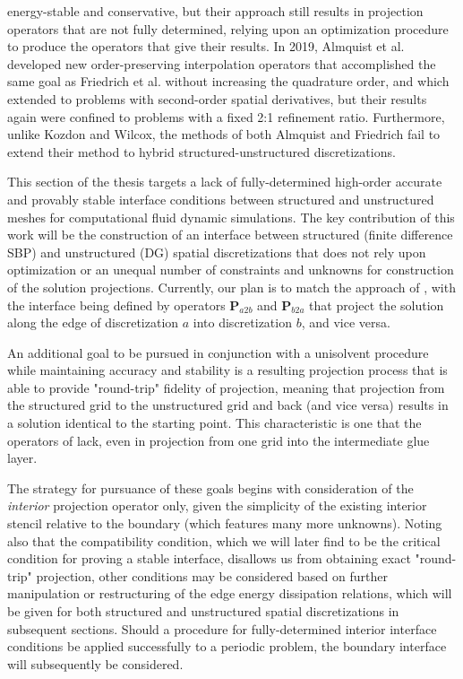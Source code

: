 energy-stable and conservative, but their approach still results in projection
operators that are not fully determined, relying upon an optimization procedure
to produce the operators that give their results. In 2019, Almquist et al.
\cite{almquist2019order} developed new order-preserving interpolation operators that accomplished
the same goal as Friedrich et al. without increasing the quadrature order, and which
extended to problems with second-order spatial derivatives, but their results again
were confined to problems with a fixed 2:1 refinement ratio. Furthermore, unlike Kozdon
and Wilcox, the methods of both Almquist and Friedrich fail to extend their method
to hybrid structured-unstructured discretizations.


This section of the thesis targets a lack of fully-determined high-order
accurate and provably stable interface conditions between structured and unstructured
meshes for computational fluid dynamic simulations. The key contribution of this work
will be the construction of an interface between structured (finite difference SBP)
and unstructured (DG) spatial discretizations that does not rely upon
optimization or an unequal number of constraints and unknowns for construction
of the solution projections. Currently, our plan is to match the approach of
\cite{kozdon2016stable}, with the interface being defined by operators $\pmb{P}_{a2b}$
and $\pmb{P}_{b2a}$ that project the solution along the edge of discretization $a$
into discretization $b$, and vice versa.

An additional goal to be pursued in conjunction with a unisolvent procedure while
maintaining accuracy and stability is a resulting projection process that is able to
provide "round-trip" fidelity of projection, meaning that projection from the structured
grid to the unstructured grid and back (and vice versa) results in a solution identical to the starting
point. This characteristic is one that the operators of \cite{kozdon2016stable} lack,
even in projection from one grid into the intermediate glue layer.

The strategy for pursuance of these goals begins with consideration of the
\emph{interior} projection operator only, given the simplicity of the existing
interior stencil relative to the boundary (which features many more unknowns).
Noting also that the compatibility condition, which we will later find to be the
critical condition for proving a stable interface, disallows us from obtaining
exact "round-trip" projection, other conditions may be considered based
on further manipulation or restructuring of the edge energy dissipation relations,
which will be given for both structured and unstructured spatial discretizations
in subsequent sections. Should a procedure for fully-determined interior interface
conditions be applied successfully to a periodic problem, the boundary interface
will subsequently be considered.

